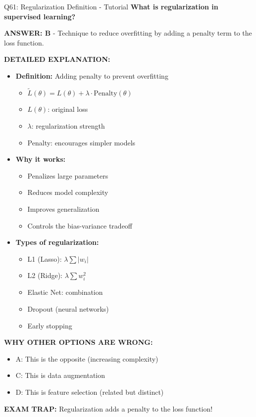 \documentclass[8pt]{beamer}
\begin{document}
	\begin{frame}{Q61: Regularization Definition - Tutorial}
		\fontsize{6.5}{7.5}\selectfont
		\textbf{What is regularization in supervised learning?}
		
		\vspace{0.05cm}
		\textcolor{myblue}{\textbf{ANSWER: B}} - Technique to reduce overfitting by adding a penalty term to the loss function.
		
		\vspace{0.05cm}
		\textbf{DETAILED EXPLANATION:}
		\begin{itemize}
			\item \textbf{Definition:} Adding penalty to prevent overfitting
			\begin{itemize}
				\item $\tilde{L}(\theta) = L(\theta) + \lambda \cdot \text{Penalty}(\theta)$
				\item $L(\theta)$: original loss
				\item $\lambda$: regularization strength
				\item Penalty: encourages simpler models
			\end{itemize}
			\item \textbf{Why it works:}
			\begin{itemize}
				\item Penalizes large parameters
				\item Reduces model complexity
				\item Improves generalization
				\item Controls the bias-variance tradeoff
			\end{itemize}
			\item \textbf{Types of regularization:}
			\begin{itemize}
				\item L1 (Lasso): $\lambda \sum |w_i|$
				\item L2 (Ridge): $\lambda \sum w_i^2$
				\item Elastic Net: combination
				\item Dropout (neural networks)
				\item Early stopping
			\end{itemize}
		\end{itemize}
		
		\vspace{0.05cm}
		\textcolor{myred}{\textbf{WHY OTHER OPTIONS ARE WRONG:}}
		\begin{itemize}
			\item \textcolor{myred}{A:} This is the opposite (increasing complexity)
			\item \textcolor{myred}{C:} This is data augmentation
			\item \textcolor{myred}{D:} This is feature selection (related but distinct)
		\end{itemize}
		
		\textcolor{myred}{\textbf{EXAM TRAP:}} Regularization adds a penalty to the loss function!
	\end{frame}
	
\end{document}
